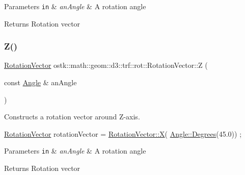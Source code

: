 \begin{DoxyParams}[1]{Parameters}
\mbox{\tt in}  & {\em an\+Angle} & A rotation angle \\
\hline
\end{DoxyParams}
\begin{DoxyReturn}{Returns}
Rotation vector 
\end{DoxyReturn}
\mbox{\label{classostk_1_1math_1_1geom_1_1d3_1_1trf_1_1rot_1_1_rotation_vector_a6ffce9680c2947b0da14c7c8e4d6a72b}} 
\subsubsection{\texorpdfstring{Z()}{Z()}}
{\footnotesize\ttfamily \hyperlink{classostk_1_1math_1_1geom_1_1d3_1_1trf_1_1rot_1_1_rotation_vector}{Rotation\+Vector} ostk\+::math\+::geom\+::d3\+::trf\+::rot\+::\+Rotation\+Vector\+::Z (\begin{DoxyParamCaption}\item[{const \hyperlink{classostk_1_1math_1_1geom_1_1_angle}{Angle} \&}]{an\+Angle }\end{DoxyParamCaption})\hspace{0.3cm}{\ttfamily [static]}}



Constructs a rotation vector around Z-\/axis. 


\begin{DoxyCode}
\hyperlink{classostk_1_1math_1_1geom_1_1d3_1_1trf_1_1rot_1_1_rotation_vector_ad05e6af649dbdd145793773e2ab1cdce}{RotationVector} rotationVector = \hyperlink{classostk_1_1math_1_1geom_1_1d3_1_1trf_1_1rot_1_1_rotation_vector_af24a0322c5b9c2bbfb745468e97147e9}{RotationVector::X}(
      \hyperlink{classostk_1_1math_1_1geom_1_1_angle_a2cefda601167af07f61f0477776203ca}{Angle::Degrees}(45.0)) ;
\end{DoxyCode}



\begin{DoxyParams}[1]{Parameters}
\mbox{\tt in}  & {\em an\+Angle} & A rotation angle \\
\hline
\end{DoxyParams}
\begin{DoxyReturn}{Returns}
Rotation vector 
\end{DoxyReturn}


